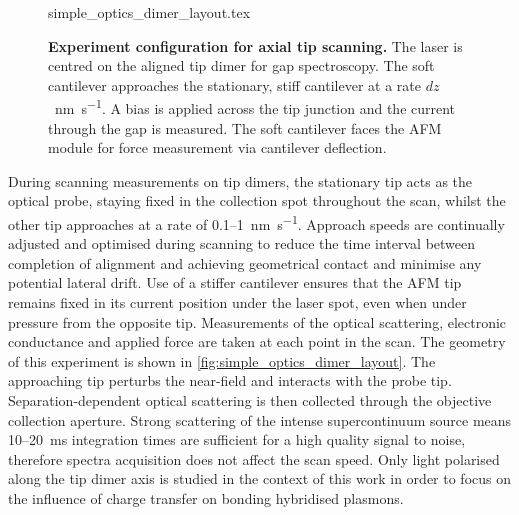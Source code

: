 \documentclass[a4paper]{article}
\begin{document}
\begin{figure}[bt]
\centering
\fontsize{10pt}{1em}\selectfont
\def\svgwidth{0.6\textwidth}
{simple_optics_dimer_layout.tex}
\caption[Experiment configuration for axial tip scanning]{\textbf{Experiment configuration for axial tip scanning.} The laser is centred on the aligned tip dimer for gap spectroscopy. The soft cantilever approaches the stationary, stiff cantilever at a rate $dz$~\si{\nano\metre\per\second}. A bias is applied across the tip junction and the current through the gap is measured. The soft cantilever faces the AFM module for force measurement via cantilever deflection.}
\label{fig:simple_optics_dimer_layout}
\end{figure}

During scanning measurements on tip dimers, the stationary tip acts as the optical probe, staying fixed in the collection spot throughout the scan, whilst the other tip approaches at a rate of 0.1--\SI{1}{\nano\metre\per\second}. Approach speeds are continually adjusted and optimised during scanning to reduce the time interval between completion of alignment and achieving geometrical contact and minimise any potential lateral drift. Use of a stiffer cantilever ensures that the AFM tip remains fixed in its current position under the laser spot, even when under pressure from the opposite tip. Measurements of the optical scattering, electronic conductance and applied force are taken at each point in the scan. The geometry of this experiment is shown in \autoref{fig:simple_optics_dimer_layout}.
The approaching tip perturbs the near-field and interacts with the probe tip. Separation-dependent optical scattering is then collected through the objective collection aperture. Strong scattering of the intense supercontinuum source means 10--\SI{20}{ms} integration times are sufficient for a high quality signal to noise, therefore spectra acquisition does not affect the scan speed. %
Only light polarised along the tip dimer axis is studied in the context of this work in order to focus on the influence of charge transfer on bonding hybridised plasmons. %
\end{document}
